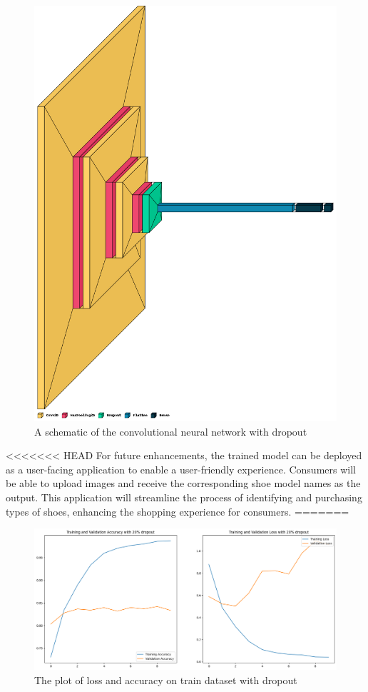 \documentclass[11pt,a4paper]{article}
\begin{document}
 \begin{figure}[h!]
 \centering
  \includegraphics[width=0.85\linewidth]{dropout_schema.png}
  \caption{A schematic of the convolutional neural network with dropout}
  \label{dropout_schema}
\end{figure}


<<<<<<< HEAD
For future enhancements, the trained model can be deployed as a user-facing application to enable a user-friendly experience. Consumers will be able to upload images and receive the corresponding shoe model names as the output. This application will streamline the process of identifying and purchasing types of shoes, enhancing the shopping experience for consumers. 
=======
 \begin{figure}[h!]
 \centering
  \includegraphics[width=\linewidth]{dropout_training_plot.png}
  \caption{The plot of loss and accuracy on train dataset with dropout}
  \label{dropout_training}
\end{figure}
\FloatBarrier
\end{document}

